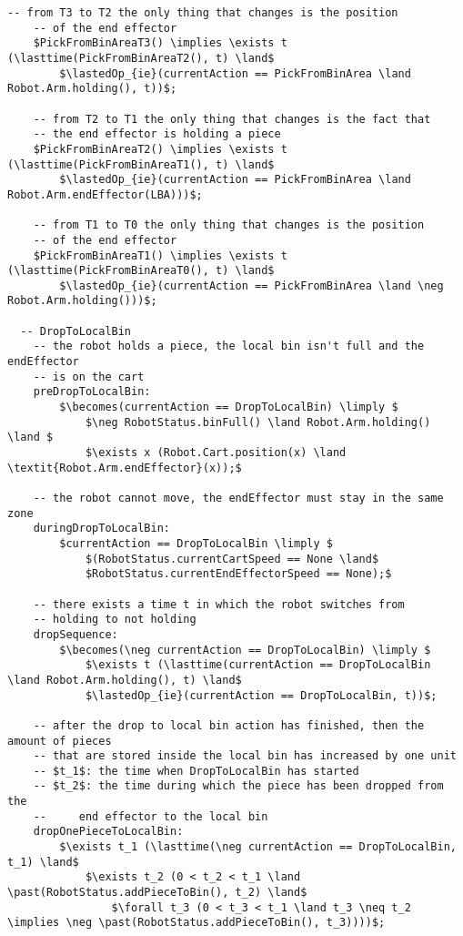 \begin{lstlisting}[fontadjust, mathescape, frame=single]
    -- from T3 to T2 the only thing that changes is the position
    -- of the end effector
    $PickFromBinAreaT3() \implies \exists t (\lasttime(PickFromBinAreaT2(), t) \land$
        $\lastedOp_{ie}(currentAction == PickFromBinArea \land Robot.Arm.holding(), t))$;

    -- from T2 to T1 the only thing that changes is the fact that
    -- the end effector is holding a piece
    $PickFromBinAreaT2() \implies \exists t (\lasttime(PickFromBinAreaT1(), t) \land$
        $\lastedOp_{ie}(currentAction == PickFromBinArea \land Robot.Arm.endEffector(LBA)))$;
    
    -- from T1 to T0 the only thing that changes is the position
    -- of the end effector
    $PickFromBinAreaT1() \implies \exists t (\lasttime(PickFromBinAreaT0(), t) \land$
        $\lastedOp_{ie}(currentAction == PickFromBinArea \land \neg Robot.Arm.holding()))$;
      
  -- DropToLocalBin
    -- the robot holds a piece, the local bin isn't full and the endEffector 
    -- is on the cart
    preDropToLocalBin:
        $\becomes(currentAction == DropToLocalBin) \limply $
            $\neg RobotStatus.binFull() \land Robot.Arm.holding() \land $
            $\exists x (Robot.Cart.position(x) \land \textit{Robot.Arm.endEffector}(x));$
    
    -- the robot cannot move, the endEffector must stay in the same zone
    duringDropToLocalBin:
        $currentAction == DropToLocalBin \limply $
            $(RobotStatus.currentCartSpeed == None \land$
            $RobotStatus.currentEndEffectorSpeed == None);$
  
    -- there exists a time t in which the robot switches from 
    -- holding to not holding
    dropSequence:
        $\becomes(\neg currentAction == DropToLocalBin) \limply $
            $\exists t (\lasttime(currentAction == DropToLocalBin \land Robot.Arm.holding(), t) \land$
            $\lastedOp_{ie}(currentAction == DropToLocalBin, t))$;

    -- after the drop to local bin action has finished, then the amount of pieces
    -- that are stored inside the local bin has increased by one unit
    -- $t_1$: the time when DropToLocalBin has started
    -- $t_2$: the time during which the piece has been dropped from the
    --     end effector to the local bin
    dropOnePieceToLocalBin:
        $\exists t_1 (\lasttime(\neg currentAction == DropToLocalBin, t_1) \land$
            $\exists t_2 (0 < t_2 < t_1 \land \past(RobotStatus.addPieceToBin(), t_2) \land$
                $\forall t_3 (0 < t_3 < t_1 \land t_3 \neq t_2 \implies \neg \past(RobotStatus.addPieceToBin(), t_3))))$;


\end{lstlisting}

